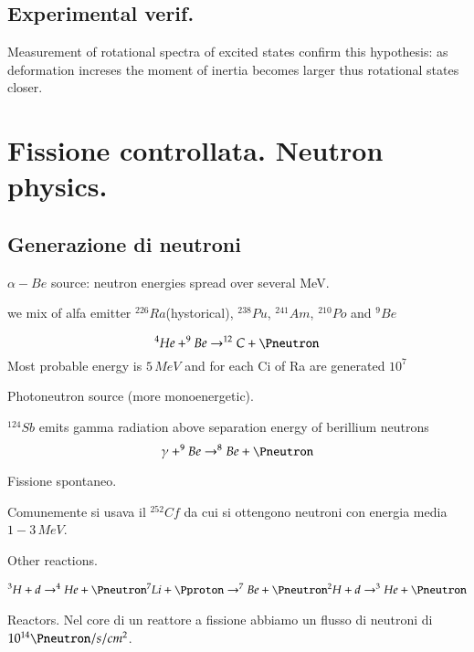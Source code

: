 \clearpage

\subsection{Experimental verif.}
Measurement of rotational spectra of excited states confirm this hypothesis: as deformation increses the moment of inertia becomes larger thus rotational states closer.

\section{Fissione controllata. Neutron physics.}

\subsection{Generazione di neutroni}
\begin{itemize*}
\item $\alpha-Be$ source: neutron energies spread over several MeV.

we mix of alfa emitter $^{226}Ra$(hystorical), $^{238}Pu$, $^{241}Am$, $^{210}Po$ and $^9Be$

\begin{equation*}
^4He+^9Be\to^{12}C+\Pneutron
\end{equation*}
Most probable energy is $5\,MeV$ and for each Ci of Ra are generated $10^7$ \Pneutron  
\item Photoneutron source (more monoenergetic).

$^{124}Sb$ emits gamma radiation above separation energy of berillium neutrons 
\begin{equation*}
\gamma+^9Be\to^8Be+\Pneutron
\end{equation*}

\item Fissione spontaneo.

Comunemente si usava il $^{252}Cf$ da cui si ottengono neutroni con energia media $1-3\,MeV$.

\item Other reactions.

\begin{align*}
^3H+d\to^4He+\Pneutron
^7Li+\Pproton\to^7Be+\Pneutron
^2H+d\to^3He+\Pneutron
\end{align*}

\item Reactors.
Nel core di un reattore a fissione abbiamo un flusso di neutroni di $10^{14}\Pneutron/s/cm^2$.

\end{itemize*}

